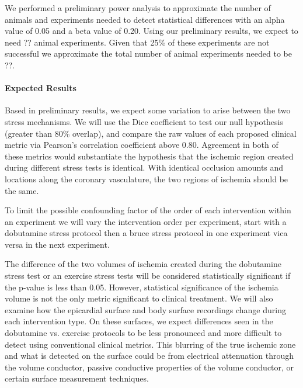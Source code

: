 We performed a preliminary power analysis to approximate the number of animals and experiments needed to detect statistical differences with an alpha value of 0.05 and a beta value of 0.20. Using our preliminary results, we expect to need ?? animal experiments. Given that 25\% of these experiments are not successful we approximate the total number of animal experiments needed to be ??. 

\paragraph{Expected Results} Based in preliminary results, we expect some
variation to arise between the two stress mechanisms.  We will use the Dice
coefficient to test our null hypothesis (greater than 80\% overlap), and
compare the raw values of each proposed clinical metric via Pearson's correlation
coefficient above 0.80. Agreement in both of these metrics would
substantiate the hypothesis that the ischemic region created during
different stress tests is identical. With identical occlusion amounts and
locations along the coronary vasculature, the two regions of ischemia
should be the same. 

To limit the possible confounding factor of the order of each intervention within an experiment we will vary the intervention order per experiment, \ie{} start with a dobutamine stress protocol then a bruce stress protocol in one experiment vica versa in the next experiment. 

The difference of the two volumes of ischemia created during the dobutamine stress test or an exercise stress tests will be considered statistically significant if the p-value is less than 0.05. However, statistical significance of the ischemia volume is not the only metric significant to clinical treatment. We will also examine how the epicardial surface and body surface recordings change during each intervention type. On these surfaces, we expect differences seen in the dobutamine vs. exercise protocols to be less pronounced and more difficult to detect using conventional clinical metrics. This blurring of the true ischemic zone and what is detected on the surface could be from electrical attenuation through the volume conductor, passive conductive properties of the volume conductor, or certain surface measurement techniques. 

